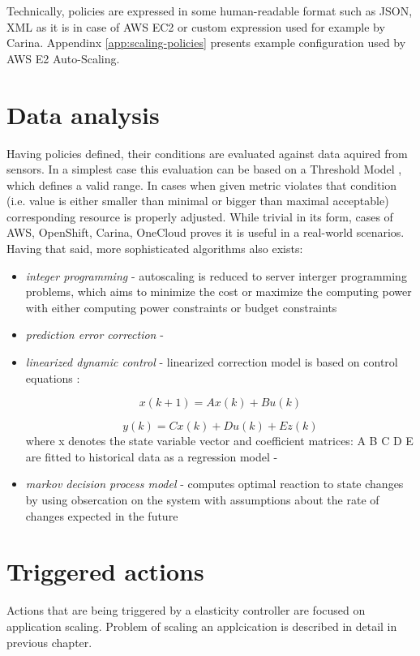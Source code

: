 Technically, policies are expressed in some human-readable format such as JSON, XML as it is in case of AWS EC2 or custom expression used for example by Carina. Appendinx \ref{app:scaling-policies} presents example configuration used by AWS E2 Auto-Scaling.

\section{Data analysis}
Having policies defined, their conditions are evaluated against data aquired from sensors. In a simplest case this evaluation can be based on a Threshold Model \cite{LiWoZh05}, which defines a valid range. In cases when given metric violates that condition (i.e. value is either smaller than minimal or bigger than maximal acceptable) corresponding resource is properly adjusted. While trivial in its form, cases of AWS, OpenShift, Carina, OneCloud proves it is useful in a real-world scenarios. Having that said, more sophisticated algorithms also exists:
\begin{itemize}
  \item \textit{integer programming} - autoscaling is reduced to server interger programming problems, which aims to minimize the cost or maximize the computing power with either computing power constraints or
budget constraints \cite{MaLiHu10}
  \item \textit{prediction error correction} - \cite{ShSuGuWi11}
  \item \textit{linearized dynamic control} - linearized correction model is based on control equations \cite{AbShBh02}:
  
    \begin{equation}
      x(k+1)=Ax(k)+Bu(k)
    \end{equation}
    
    \begin{equation}
       y(k) = C x(k) + D u(k) + E z(k)
    \end{equation}
    where x denotes the state variable vector and coefficient matrices: A B C D E are fitted to historical data as a regression model - \cite{DiLuFrHePa03}

  \item \textit{markov decision process model} - computes optimal reaction to state changes by using obsercation on the system with assumptions about the rate of changes expected in the future \cite{AbWo02}
\end{itemize}

\section{Triggered actions}
Actions that are being triggered by a elasticity controller are focused on application scaling. Problem of scaling an applcication is described in detail in previous chapter.

